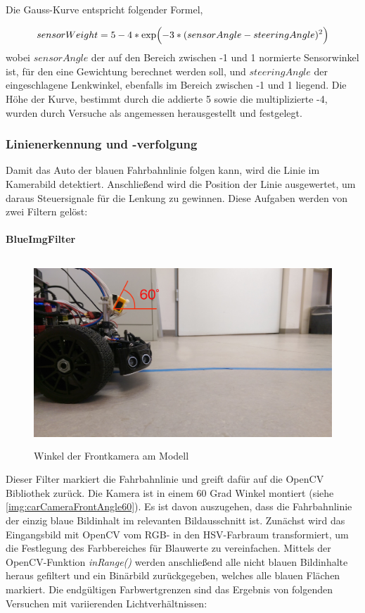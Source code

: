 \documentclass[12pt, a4paper]{scrartcl}
\begin{document}
Die Gauss-Kurve entspricht folgender Formel,

\begin{equation}\label{eq:gaussian-weighted-dist}
sensorWeight= 5 - 4 * \exp\Bigl({-3 * (sensorAngle - steeringAngle)^2}\Bigr)
\end{equation}
wobei $sensorAngle$ der auf den Bereich zwischen -1 und 1 normierte Sensorwinkel ist, für den eine Gewichtung berechnet werden soll, und $steeringAngle$ der eingeschlagene Lenkwinkel, ebenfalls im Bereich zwischen -1 und 1 liegend. Die Höhe der Kurve, bestimmt durch die addierte 5 sowie die multiplizierte -4, wurden durch Versuche als angemessen herausgestellt und festgelegt.


\clearpage

\subsubsection{Linienerkennung und -verfolgung}
Damit das Auto der blauen Fahrbahnlinie folgen kann, wird die Linie im Kamerabild detektiert. Anschließend wird die Position der Linie ausgewertet, um daraus Steuersignale für die Lenkung zu gewinnen. Diese Aufgaben werden von zwei Filtern gelöst:

\paragraph{BlueImgFilter}
\begin{figure}[h]
	\centering
	\includegraphics[width=\textwidth, height=7cm, keepaspectratio]{Bilder/carCameraFrontAngle60.jpg}
	\caption{Winkel der Frontkamera am Modell}
	\label{img:carCameraFrontAngle60}
\end{figure}

Dieser Filter markiert die Fahrbahnlinie und greift dafür auf die OpenCV Bibliothek zurück. Die Kamera ist in einem 60 Grad Winkel montiert (siehe \autoref{img:carCameraFrontAngle60}). Es ist davon auszugehen, dass die Fahrbahnlinie der einzig blaue Bildinhalt im relevanten Bildausschnitt ist. Zunächst wird das Eingangsbild mit OpenCV vom RGB- in den HSV-Farbraum transformiert, um die Festlegung des Farbbereiches für Blauwerte zu vereinfachen. Mittels der OpenCV-Funktion \emph{inRange()} werden anschließend alle nicht blauen Bildinhalte heraus gefiltert und ein Binärbild zurückgegeben, welches alle blauen Flächen markiert. Die endgültigen Farbwertgrenzen sind das Ergebnis von folgenden Versuchen mit variierenden Lichtverhältnissen:
\end{document}
